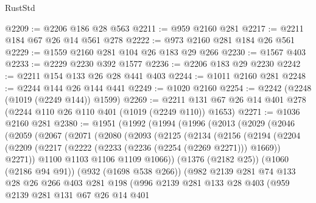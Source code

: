 \begin{lexlean}{RustStd}
\begin{coremodule}
@2209 := @2206 @186 @28 @563
@2211 := @959 @2160 @281
@2217 := @2211 @184 @67 @26 @14 @561 @278
@2222 := @973 @2160 @281 @184 @26 @561
@2229 := @1559 @2160 @281 @104 @26 @183 @29 @266
@2230 := @1567 @403
@2233 := @2229 @2230 @392 @1577
@2236 := @2206 @183 @29 @2230
@2242 := @2211 @154 @133 @26 @28 @441 @403
@2244 := @1011 @2160 @281
@2248 := @2244 @144 @26 @144 @441
@2249 := @1020 @2160
@2254 := @2242 (@2248 (@1019 (@2249 @144)) @1599)
@2269 := @2211 @131 @67 @26 @14 @401 @278 (@2244 @110 @26 @110 @401 (@1019 (@2249 @110)) @1653)
@2271 := @1036 @2160 @281
@2380 := @1951
    (@1992
      (@1994
        (@1996
          (@2013
            (@2029
              (@2046
                (@2059
                  (@2067
                    (@2071
                      (@2080
                        (@2093
                          (@2125
                            (@2134
                              (@2156
                                (@2194
                                  (@2204
                                    (@2209
                                      (@2217
                                        (@2222 (@2233 (@2236 (@2254 (@2269 @2271))) @1669))
                                        @2271))
                                    @1100
                                    @1103
                                    @1106
                                    @1109
                                    @1066))
                                (@1376 (@2182 @25))
                                (@1060 (@2186 @94 @91))
                                (@932 (@1698 @538 @266))
                                (@982
                                  @2139
                                  @281
                                  @74
                                  @133
                                  @28
                                  @26
                                  @266
                                  @403
                                  @281
                                  @198
                                  (@996
                                    @2139
                                    @281
                                    @133
                                    @28
                                    @403
                                    (@959
                                      @2139
                                      @281
                                      @131
                                      @67
                                      @26
                                      @14
                                      @401

\end{coremodule}
\end{lexlean}
